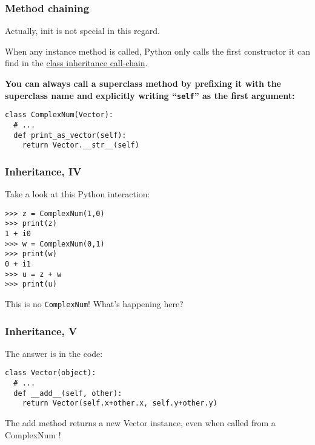 \begin{frame}[fragile]\frametitle{Method chaining}

  Actually, init is not special in this regard.

  When any instance method is called, Python only calls the first
  constructor it can find in the
  \href{http://www.python.org/download/releases/2.3/mro/}{class
    inheritance call-chain}.

  \textbf{You can always call a superclass method by prefixing it
    with the superclass name and explicitly writing ``\texttt{self}''
    as the first argument:}
    \begin{lstlisting}
class ComplexNum(Vector):
  # ...
  def print_as_vector(self):
    return Vector.__str__(self)
    \end{lstlisting}
\end{frame}

\begin{frame}[fragile]\frametitle{Inheritance, IV}
Take a look at this Python interaction:
\begin{lstlisting}
>>> z = ComplexNum(1,0)
>>> print(z)
1 + i0
>>> w = ComplexNum(0,1)
>>> print(w)
0 + i1
>>> u = z + w
>>> print(u)
\end{lstlisting}

 This is no \texttt{ComplexNum}! What's happening here?

\end{frame}

\begin{frame}[fragile]\frametitle{Inheritance, V}
  The answer is in the code:
    \begin{lstlisting}
class Vector(object):
  # ...
  def __add__(self, other):
    return Vector(self.x+other.x, self.y+other.y)
    \end{lstlisting}
    
    The add method returns a new
    Vector instance, even when called from a
    ComplexNum !
\end{frame}

